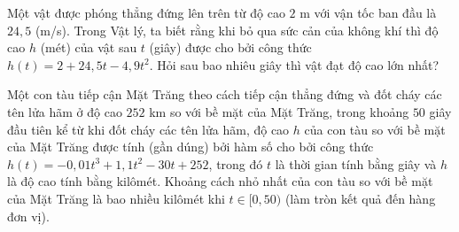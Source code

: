 \begin{bt}%
	Một vật được phóng thẳng đứng lên trên từ độ cao $2$ m  với vận tốc ban đầu là $24{,}5$ (m/s). Trong Vật lý, ta biết rằng khi bỏ qua sức cản của không khí thì độ cao $h$ (mét) của vật sau $t$ (giây) được cho bởi công thức $h(t)=2+24{,}5t-4{,}9t^2$. Hỏi sau bao nhiêu giây thì vật đạt độ cao lớn nhất?
\end{bt}

\begin{bt}%
	Một con tàu tiếp cận Mặt Trăng theo cách tiếp cận thẳng đứng và đốt cháy các tên lửa hãm ở độ cao $252$ km so với bề mặt của Mặt Trăng, trong khoảng $50$ giây đầu tiên kể từ khi đốt cháy các tên lửa hãm, độ cao $h$ của con tàu  so với bề mặt của Mặt Trăng được tính (gần dúng) bởi hàm số cho bởi công thức $h(t)=-0{,}01t^3+1{,}1t^2-30t+ 252$, trong đó $t$ là thời gian tính bằng giây và $h$
	là độ cao tính bằng kilômét. Khoảng cách nhỏ nhất của con tàu so với bề mặt của Mặt Trăng là bao nhiều kilômét khi $t\in  [0{,}50)$ (làm tròn kết quả đến hàng đơn vị).
\end{bt}

